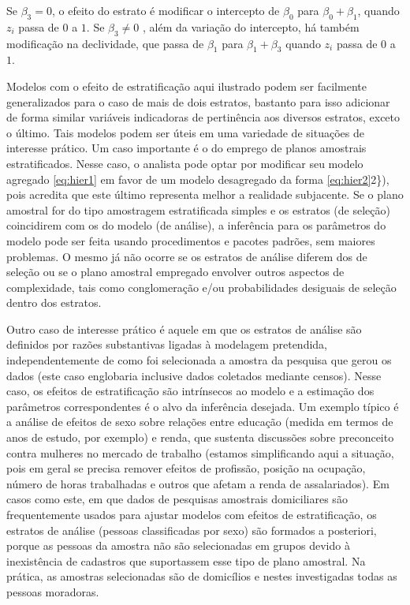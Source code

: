 \documentclass[]{book}
\numberwithin{example}{chapter}
\numberwithin{remark}{chapter}
\numberwithin{definition}{chapter}
\begin{document}
Se \(\beta _{3}=0\), o efeito do estrato é modificar o intercepto de
\(\beta _{0}\) para \(\beta _{0}+\beta _{1}\), quando \(z_{i}\) passa de
\(0\) a \(1\). Se \(\beta _{3}\neq 0\) , além da variação do intercepto,
há também modificação na declividade, que passa de \(\beta _{1}\) para
\(\beta _{1}+\beta _{3}\) quando \(z_{i}\) passa de \(0\) a \(1\).

Modelos com o efeito de estratificação aqui ilustrado podem ser
facilmente generalizados para o caso de mais de dois estratos, bastanto
para isso adicionar de forma similar variáveis indicadoras de
pertinência aos diversos estratos, exceto o último. Tais modelos podem
ser úteis em uma variedade de situações de interesse prático. Um caso
importante é o do emprego de planos amostrais estratificados. Nesse
caso, o analista pode optar por modificar seu modelo agregado
\eqref{eq:hier1} em favor de um modelo desagregado da forma
\eqref{eq:hier2}2\}), pois acredita que este último representa melhor a
realidade subjacente. Se o plano amostral for do tipo amostragem
estratificada simples e os estratos (de seleção) coincidirem com os do
modelo (de análise), a inferência para os parâmetros do modelo pode ser
feita usando procedimentos e pacotes padrões, sem maiores problemas. O
mesmo já não ocorre se os estratos de análise diferem dos de seleção ou
se o plano amostral empregado envolver outros aspectos de complexidade,
tais como conglomeração e/ou probabilidades desiguais de seleção dentro
dos estratos.

Outro caso de interesse prático é aquele em que os estratos de análise
são definidos por razões substantivas ligadas à modelagem pretendida,
independentemente de como foi selecionada a amostra da pesquisa que
gerou os dados (este caso englobaria inclusive dados coletados mediante
censos). Nesse caso, os efeitos de estratificação são intrínsecos ao
modelo e a estimação dos parâmetros correspondentes é o alvo da
inferência desejada. Um exemplo típico é a análise de efeitos de sexo
sobre relações entre educação (medida em termos de anos de estudo, por
exemplo) e renda, que sustenta discussões sobre preconceito contra
mulheres no mercado de trabalho (estamos simplificando aqui a situação,
pois em geral se precisa remover efeitos de profissão, posição na
ocupação, número de horas trabalhadas e outros que afetam a renda de
assalariados). Em casos como este, em que dados de pesquisas amostrais
domiciliares são frequentemente usados para ajustar modelos com efeitos
de estratificação, os estratos de análise (pessoas classificadas por
sexo) são formados a posteriori, porque as pessoas da amostra não são
selecionadas em grupos devido à inexistência de cadastros que
suportassem esse tipo de plano amostral. Na prática, as amostras
selecionadas são de domicílios e nestes investigadas todas as pessoas
moradoras.
\end{document}

